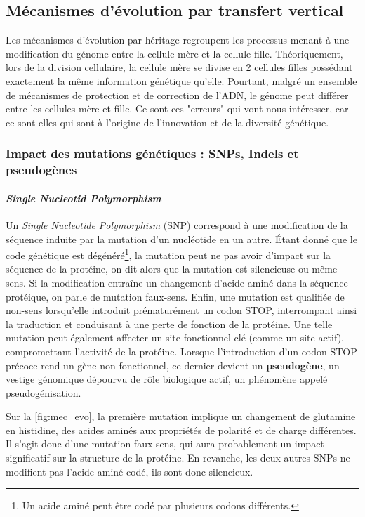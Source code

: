 \subsection{Mécanismes d'évolution par transfert vertical}
\label{sec:evo_ver}
Les mécanismes d'évolution par héritage regroupent les processus menant à une modification du génome entre la cellule mère et la cellule fille. Théoriquement, lors de la division cellulaire, la cellule mère se divise en 2 cellules filles possédant exactement la même information génétique qu'elle. Pourtant, malgré un ensemble de mécanismes de protection et de correction de l'ADN, le génome peut différer entre les cellules mère et fille. Ce sont ces "erreurs" qui vont nous intéresser, car ce sont elles qui sont à l'origine de l'innovation et de la diversité génétique.

\newpage

\subsubsection{Impact des mutations génétiques : SNPs, Indels et pseudogènes}
\paragraph{\textit{Single Nucleotid Polymorphism}}

Un \textit{Single Nucleotide Polymorphism} (SNP) correspond à une modification de la séquence induite par la mutation d'un nucléotide en un autre.
Étant donné que le code génétique est dégénéré\footnote{Un acide aminé peut être codé par plusieurs codons différents.}, la mutation peut ne pas avoir d'impact sur la séquence de la protéine, on dit alors que la mutation est silencieuse ou même sens. Si la modification entraîne un changement d’acide aminé dans la séquence protéique, on parle de mutation faux-sens. Enfin, une mutation est qualifiée de non-sens lorsqu'elle introduit prématurément un codon STOP, interrompant ainsi la traduction et conduisant à une perte de fonction de la protéine. Une telle mutation peut également affecter un site fonctionnel clé (comme un site actif), compromettant l’activité de la protéine. Lorsque l’introduction d’un codon STOP précoce rend un gène non fonctionnel, ce dernier devient un \textbf{pseudogène}, un vestige génomique dépourvu de rôle biologique actif, un phénomène appelé pseudogénisation.

Sur la \autoref{fig:mec_evo}, la première mutation implique un changement de glutamine en histidine, des acides aminés aux propriétés de polarité et de charge différentes. Il s’agit donc d’une mutation faux-sens, qui aura probablement un impact significatif sur la structure de la protéine. En revanche, les deux autres SNPs ne modifient pas l’acide aminé codé, ils sont donc silencieux.

